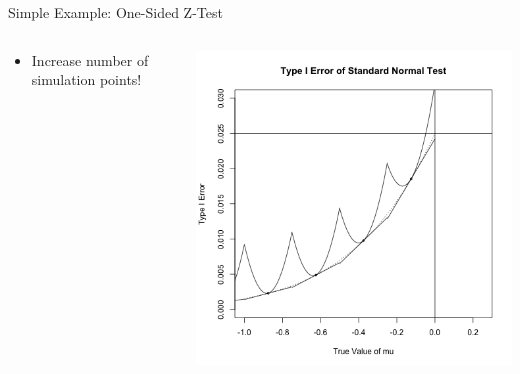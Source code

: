 \begin{frame}{Simple Example: One-Sided Z-Test}
\begin{columns}
\begin{column}{.3\textwidth}
\begin{itemize}
\item Increase number of simulation points!
\end{itemize}
\end{column}

\begin{column}{.7\textwidth}
\includegraphics[width=\textwidth]{figures/z-test-9.png}
\end{column}
\end{columns}
\end{frame}

